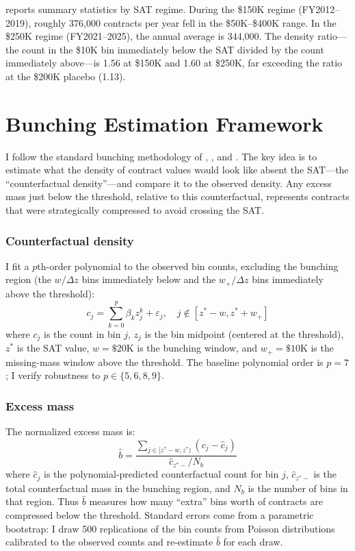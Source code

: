 \documentclass[12pt]{article}
\begin{document}
 reports summary statistics by SAT regime. During the \$150K regime (FY2012--2019), roughly 376,000 contracts per year fell in the \$50K--\$400K range. In the \$250K regime (FY2021--2025), the annual average is 344,000. The density ratio---the count in the \$10K bin immediately below the SAT divided by the count immediately above---is 1.56 at \$150K and 1.60 at \$250K, far exceeding the ratio at the \$200K placebo (1.13).



\section{Bunching Estimation Framework}

I follow the standard bunching methodology of \citet{saez2010}, \citet{chetty2011}, and \citet{kleven2013}. The key idea is to estimate what the density of contract values would look like absent the SAT---the ``counterfactual density''---and compare it to the observed density. Any excess mass just below the threshold, relative to this counterfactual, represents contracts that were strategically compressed to avoid crossing the SAT.

\subsubsection*{Counterfactual density} I fit a $p$th-order polynomial to the observed bin counts, excluding the bunching region (the $w/\Delta z$ bins immediately below and the $w_+/\Delta z$ bins immediately above the threshold):
\begin{equation}
c_j = \sum_{k=0}^{p} \beta_k z_j^k + \varepsilon_j, \quad j \notin [z^* - w, z^* + w_+]
\end{equation}
where $c_j$ is the count in bin $j$, $z_j$ is the bin midpoint (centered at the threshold), $z^*$ is the SAT value, $w = \$20$K is the bunching window, and $w_+ = \$10$K is the missing-mass window above the threshold. The baseline polynomial order is $p = 7$; I verify robustness to $p \in \{5, 6, 8, 9\}$.

\subsubsection*{Excess mass} The normalized excess mass is:
\begin{equation}
\hat{b} = \frac{\sum_{j \in [z^*-w, z^*)} (c_j - \hat{c}_j)}{\hat{c}_{z^*-} / N_b}
\end{equation}
where $\hat{c}_j$ is the polynomial-predicted counterfactual count for bin $j$, $\hat{c}_{z^*-}$ is the total counterfactual mass in the bunching region, and $N_b$ is the number of bins in that region. Thus $\hat{b}$ measures how many ``extra'' bins worth of contracts are compressed below the threshold. Standard errors come from a parametric bootstrap: I draw 500 replications of the bin counts from Poisson distributions calibrated to the observed counts and re-estimate $\hat{b}$ for each draw.
\end{document}
